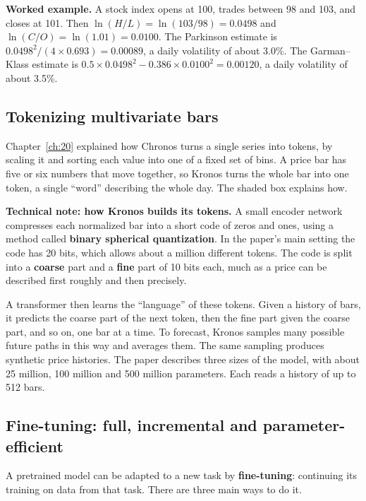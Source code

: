 \textbf{Worked example.} A stock index opens at 100, trades between 98 and 103, and closes at 101. Then $\ln(H/L) = \ln(103/98) = 0.0498$ and $\ln(C/O) = \ln(1.01) = 0.0100$. The Parkinson estimate is $0.0498^2/(4 \times 0.693) = 0.00089$, a daily volatility of about 3.0\%. The Garman--Klass estimate is $0.5 \times 0.0498^2 - 0.386 \times 0.0100^2 = 0.00120$, a daily volatility of about 3.5\%.

\subsection{Tokenizing multivariate bars}

Chapter~\ref{ch:20} explained how Chronos turns a single series into tokens, by scaling it and sorting each value into one of a fixed set of bins. A price bar has five or six numbers that move together, so Kronos turns the whole bar into one token, a single ``word'' describing the whole day. The shaded box explains how.

\begin{technote}
\textbf{Technical note: how Kronos builds its tokens.} A small encoder network compresses each normalized bar into a short code of zeros and ones, using a method called \textbf{binary spherical quantization}. In the paper's main setting the code has 20 bits, which allows about a million different tokens. The code is split into a \textbf{coarse} part and a \textbf{fine} part of 10 bits each, much as a price can be described first roughly and then precisely.
\end{technote}

A transformer then learns the ``language'' of these tokens. Given a history of bars, it predicts the coarse part of the next token, then the fine part given the coarse part, and so on, one bar at a time. To forecast, Kronos samples many possible future paths in this way and averages them. The same sampling produces synthetic price histories. The paper describes three sizes of the model, with about 25 million, 100 million and 500 million parameters. Each reads a history of up to 512 bars.

\subsection{Fine-tuning: full, incremental and parameter-efficient}

A pretrained model can be adapted to a new task by \textbf{fine-tuning}: continuing its training on data from that task. There are three main ways to do it.

